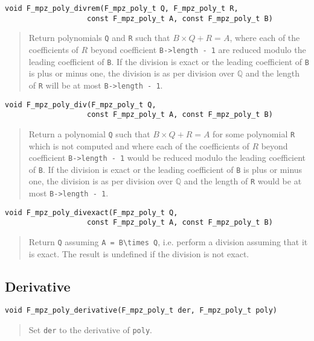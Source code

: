 \documentclass[a4paper,10pt]{article}
\newcommand{\Q}{\mathbb{Q}}
\newcommand{\code}{\lstinline}
\begin{document}
\begin{lstlisting}
void F_mpz_poly_divrem(F_mpz_poly_t Q, F_mpz_poly_t R, 
                   const F_mpz_poly_t A, const F_mpz_poly_t B)
\end{lstlisting}
\begin{quote}
Return polynomials \code{Q} and \code{R} such that $B\times Q + R = A$, where each of the coefficients
of $R$ beyond coefficient \code{B->length - 1} are reduced modulo the leading coefficient of \code{B}.
If the division is exact or the leading coefficient of \code{B} is plus or minus one, the division is
as per division over $\Q$ and the length of \code{R} will be at most \code{B->length - 1}.
\end{quote}

\begin{lstlisting}
void F_mpz_poly_div(F_mpz_poly_t Q, 
                   const F_mpz_poly_t A, const F_mpz_poly_t B)
\end{lstlisting}
\begin{quote}
Return a polynomial \code{Q} such that $B\times Q + R = A$ for some polynomial \code{R} which is not
computed and where each of the coefficients of $R$ beyond coefficient \code{B->length - 1} would be
reduced modulo the leading coefficient of \code{B}. If the division is exact or the leading coefficient 
of \code{B} is plus or minus one, the division is as per division over $\Q$ and the length of \code{R} 
would be at most \code{B->length - 1}.
\end{quote}

\begin{lstlisting}
void F_mpz_poly_divexact(F_mpz_poly_t Q, 
                   const F_mpz_poly_t A, const F_mpz_poly_t B)
\end{lstlisting}
\begin{quote}
Return \code{Q} assuming \code{A = B\times Q}, i.e. perform a division assuming that it is exact. The
result is undefined if the division is not exact.
\end{quote}

\subsection{Derivative}

\begin{lstlisting}
void F_mpz_poly_derivative(F_mpz_poly_t der, F_mpz_poly_t poly)
\end{lstlisting}
\begin{quote}
Set \code{der} to the derivative of \code{poly}.
\end{quote}
\end{document}
